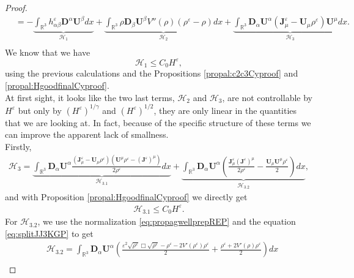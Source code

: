 \documentclass[a4paper, 15pt]{article}
\numberwithin{equation}{section}
\begin{document}
\begin{proof}
\begin{align*}
  &=-\underbrace{\int_{\mathbb{R}^3}{h^\varepsilon_{\alpha\beta}\textbf{D}^\alpha \textbf{U}^\beta dx}}_\text{$\mathscr{H}_1$}+\underbrace{\int_{\mathbb{R}^3}{\rho \textbf{D}_\beta \textbf{U}^\beta V''(\rho)(\rho^\varepsilon-\rho)dx}}_\text{$\mathscr{H}_2$}+\underbrace{\int_{\mathbb{R}^3}{\textbf{D}_\alpha \textbf{U}^\alpha(\textbf{J}^\varepsilon_\mu-\textbf{U}_\mu \rho^\varepsilon)\textbf{U}^\mu dx}}_\text{$\mathscr{H}_3$}.\\
\end{align*}
We  know that we have
\begin{equation}
\label{eq:control1parHPgproof}
    \mathscr{H}_1\leq C_0 H^\varepsilon,
\end{equation}
using the previous calculations and the Propositions \ref{propal:c2c3Cyproof} and \ref{propal:HgoodfinalCyproof}.\\
At first sight, it looks like the two last terms, $\mathscr{H}_2$ and $\mathscr{H}_3$, are not controllable by $H^\varepsilon$ but only by $(H^\varepsilon)^{1/\gamma}$ and $(H^\varepsilon)^{1/2}$, they are only linear in the quantities that we are looking at.
In fact, because of the specific structure of these terms we can improve the apparent lack of smallness.\\
Firstly,
\begin{align*}
\mathscr{H}_3=\underbrace{\int_{\mathbb{R}^3}{\textbf{D}_\alpha \textbf{U}^\alpha \frac{(\textbf{J}^\varepsilon_\mu-\textbf{U}_\mu \rho^\varepsilon)(\textbf{U}^\mu \rho^\varepsilon-(\textbf{J}^\varepsilon)^\mu)}{2\rho^\varepsilon}dx}}_\text{$\mathscr{H}_{3.1}$}+\underbrace{\int_{\mathbb{R}^3}{\textbf{D}_\alpha \textbf{U}^\alpha (\frac{\textbf{J}^\varepsilon_\mu(\textbf{J}^\varepsilon)^\mu}{2\rho^\varepsilon}-\frac{\textbf{U}_\mu \textbf{U}^\mu \rho^\varepsilon}{2})dx}}_\text{$\mathscr{H}_{3.2}$},
\end{align*}
and with Proposition \ref{propal:HgoodfinalCyproof} we directly get 
\begin{align}
\label{eq:control2parHPgproof}
\mathscr{H}_{3.1}\leq C_0H^\varepsilon.
\end{align}
For $\mathscr{H}_{3.2}$, we use the normalization \eqref{eq:propagwellprepREP} and the equation \eqref{eq:splitJJ3KGP} to get 
\begin{align*}
    &\mathscr{H}_{3.2}=\int_{\mathbb{R}^3}{\textbf{D}_\alpha \textbf{U}^\alpha(\frac{\varepsilon^2\sqrt{\rho^\varepsilon}\Box\sqrt{\rho^\varepsilon}-\rho^\varepsilon-2V'(\rho^\varepsilon)\rho^\varepsilon}{2}+\frac{\rho^\varepsilon+2V'(\rho)\rho^\varepsilon}{2})dx}\\

\end{align*}
\end{proof}
\end{document}
